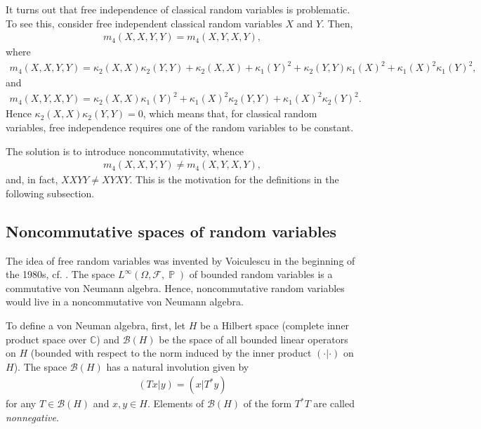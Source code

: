 \documentclass[letterpaper,11pt,oneside,reqno]{amsart}
\numberwithin{equation}{section}
\DeclareMathOperator{\PP}{\mathbb{P}}
\theoremstyle{definition}
\begin{document}
It turns out that free independence of classical random variables is problematic. 
To see this, consider free independent classical random variables $X$ and $Y$. Then, 
\begin{align*}
    m_4(X,X,Y,Y) = m_4(X,Y,X,Y),
\end{align*}
 where 
\begin{align*}
 m_4(X,X,Y,Y)=\kappa_2(X,X)\kappa_2(Y,Y)+\kappa_2(X,X)+\kappa_1(Y)^2 +\kappa_2(Y,Y)\kappa_1(X)^2+\kappa_1(X)^2\kappa_1(Y)^2,
\end{align*}
and
\begin{align*}
 m_4(X,Y,X,Y)=\kappa_2(X,X)\kappa_1(Y)^2+\kappa_1(X)^2\kappa_2(Y,Y)+\kappa_1(X)^2\kappa_2(Y)^2.
\end{align*}
Hence $\kappa_2(X,X)\kappa_2(Y,Y)=0$, which means that, for classical random variables, free independence requires one of the random variables to be constant. 

The solution is to introduce noncommutativity, whence
\begin{align*}
    m_4(X,X,Y,Y) \neq m_4(X,Y,X,Y),
\end{align*}
and, in fact, $XXYY\ne XYXY$.
This is the motivation for the definitions in the following subsection.


\subsection{Noncommutative spaces of random variables} %
\label{sub:free_random_variables}

The idea of free random variables was invented by Voiculescu in the beginning of the 
1980s, cf. \cite{Voiculescu_Free_book}. 
The space $L^\infty(\Omega, \mathcal{F},\PP)$ of bounded random variables 
is a commutative von Neumann algebra. 
Hence, noncommutative random variables would live in a noncommutative von Neumann algebra. 

To define a von Neuman algebra, first, let $H$ be a Hilbert space (complete inner product space over $\mathbb{C}$) and $\mathcal{B}(H)$ be the space of all bounded linear operators on $H$ (bounded with respect to the norm induced by the inner product $(\cdot|\cdot)$ on $H$). The space $\mathcal{B}(H)$ has a natural involution given by 
\begin{align*}
    (Tx|y)=(x|T^*y)
\end{align*}
for any $T\in \mathcal{B}(H)$ and $x,y\in H$. Elements of $\mathcal{B}(H)$
of the form $T^{*}T$ are called \emph{nonnegative}.
\end{document}
